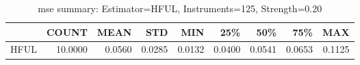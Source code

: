 \begin{table}[ht]
\centering
\caption{mse summary: Estimator=HFUL, Instruments=125, Strength=0.20}
\begin{tabular}{lrrrrrrrr}
\toprule
 & COUNT & MEAN & STD & MIN & 25\% & 50\% & 75\% & MAX \\
\midrule
HFUL & 10.0000 & 0.0560 & 0.0285 & 0.0132 & 0.0400 & 0.0541 & 0.0653 & 0.1125 \\
\bottomrule
\end{tabular}
\end{table}

